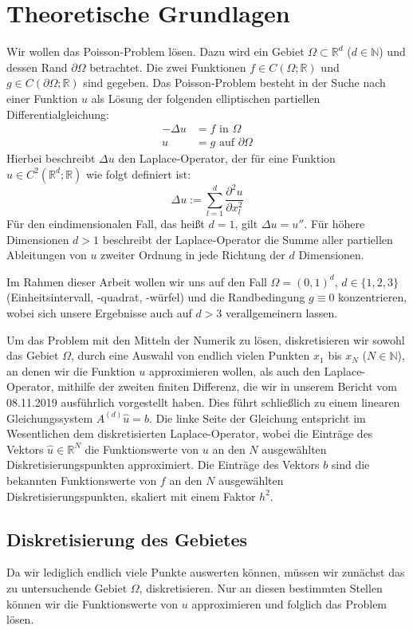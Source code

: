\documentclass{scrartcl}
\newcommand{\R}{\mathbb{R}}
\begin{document}
\pagebreak
\section{Theoretische Grundlagen}
Wir wollen das Poisson-Problem lösen.
Dazu wird ein Gebiet $\Omega\subset\R^d$ ($d\in\mathbb{N}$) und dessen Rand $\partial\Omega$ betrachtet.
Die zwei Funktionen $f\in C(\Omega ; \R)$ und $g\in C(\partial\Omega ; \R)$ sind gegeben.
Das Poisson-Problem besteht in der Suche nach einer Funktion $u$ als Lösung der folgenden elliptischen partiellen Differentialgleichung:
\[\begin{split}
-\Delta u &= f \textrm{ in } \Omega\\
        u &= g \textrm{ auf } \partial\Omega
\end{split}
\]
Hierbei beschreibt $\Delta u$ den Laplace-Operator, der für eine Funktion $u\in C^2(\R^d;\R)$ wie folgt definiert ist: \[\Delta u := \sum_{l=1}^{d} \frac{\partial^2 u}{\partial x^2_l}\]
Für den eindimensionalen Fall, das heißt $d=1$, gilt $\Delta u = u''$. Für höhere Dimensionen $d>1$ beschreibt der Laplace-Operator die Summe aller partiellen Ableitungen von $u$ zweiter Ordnung in jede Richtung der $d$ Dimensionen.

Im Rahmen dieser Arbeit wollen wir uns auf den Fall $\Omega=(0,1)^d$, $d\in\{1, 2, 3\}$ (Einheitsintervall, -quadrat, -würfel) und die Randbedingung $g\equiv0$ konzentrieren, wobei sich unsere Ergebnisse auch auf $d>3$ verallgemeinern lassen.

Um das Problem mit den Mitteln der Numerik zu lösen, diskretisieren wir sowohl das Gebiet $\Omega$, durch eine Auswahl von endlich vielen Punkten $x_1$ bis $x_N$ ($N\in\mathbb{N}$), an denen wir die Funktion $u$ approximieren wollen, als auch den Laplace-Operator, mithilfe der zweiten finiten Differenz, die wir in unserem Bericht vom 08.11.2019 ausführlich vorgestellt haben.
Dies führt schließlich zu einem linearen Gleichungssystem $A^{(d)}\hat{u}=b$.
Die linke Seite der Gleichung entspricht im Wesentlichen dem diskretisierten Laplace-Operator, wobei die Einträge des Vektors $\hat{u}\in\R^N$ die Funktionswerte von $u$ an den $N$ ausgewählten Diskretisierungspunkten approximiert.
Die Einträge des Vektors $b$ sind die bekannten Funktionswerte von $f$ an den $N$ ausgewählten Diskretisierungspunkten, skaliert mit einem Faktor $h^2$.

\subsection{Diskretisierung des Gebietes}
Da wir lediglich endlich viele Punkte auswerten können, müssen wir zunächst das zu untersuchende Gebiet  $\Omega$, diskretisieren.
Nur an diesen bestimmten Stellen können wir die Funktionswerte von $u$ approximieren und folglich das Problem lösen.
\end{document}

